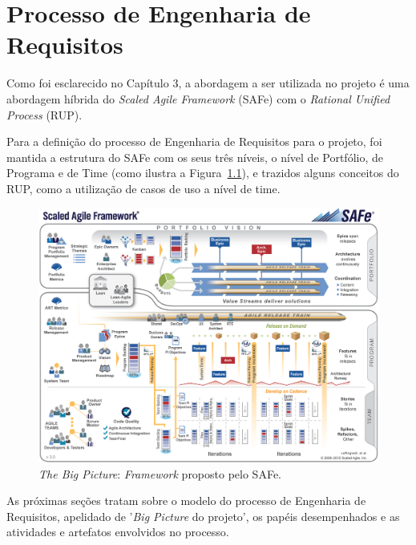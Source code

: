 \chapter[Processo de Engenharia de Requisitos]{Processo de Engenharia de Requisitos}
  
  Como foi esclarecido no Capítulo 3, a abordagem a ser utilizada no projeto é uma abordagem híbrida do 
  \textit{Scaled Agile Framework} (SAFe) com o \textit{Rational Unified Process} (RUP).
  
  Para a definição do processo de Engenharia de Requisitos para o projeto, foi mantida a estrutura do SAFe com os seus três níveis,
  o nível de Portfólio, de Programa e de Time (como ilustra a Figura~\ref{safe_big_picture}), e trazidos alguns
  conceitos do RUP, como a utilização de casos de uso a nível de time.
  
  \begin{figure}[!htbp]
    \centering
    \includegraphics[scale=0.13]{editaveis/figuras/SAFe_Big_Picture}
    \caption[The SAFe Big Picture]{\textit{The Big Picture}: \textit{Framework} proposto pelo SAFe\textregistered. \footnotemark}
    \label{safe_big_picture}
  \end{figure}
  
  As próximas seções tratam sobre o modelo do processo de Engenharia de Requisitos, apelidado de '\textit{Big Picture}
  do projeto', os papéis desempenhados e as atividades e artefatos envolvidos no processo.
  
  \pagebreak
